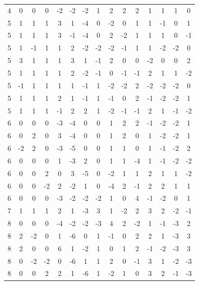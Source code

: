 \begin{table}[ht]
{\begin{tabular}{c@{\hspace{1em}}ccc@{\hspace{1em}}ccc@{\hspace{1em}}c@{\hspace{1em}}ccc@{\hspace{1em}}ccc@{\hspace{1em}}c}
 4 & 0 & 0 & 0 & -2 & -2 & -2 & 1 & 2 & 2 & 2 & 1 & 1 & 1 & 0 \\
 5 & 1 & 1 & 1 & 3 & 1 & -4 & 0 & -2 & 0 & 1 & 1 & -1 & 0 & 1 \\
 5 & 1 & 1 & 1 & 3 & -1 & -4 & 0 & 2 & -2 & 1 & 1 & 1 & 0 & -1 \\
 5 & 1 & -1 & 1 & 1 & 2 & -2 & -2 & -2 & -1 & 1 & 1 & -2 & -2 & 0 \\
 5 & 3 & 1 & 1 & 1 & 3 & 1 & -1 & 2 & 0 & 0 & -2 & 0 & 0 & 2 \\
 5 & 1 & 1 & 1 & 1 & 2 & -2 & -1 & 0 & -1 & -1 & 2 & 1 & 1 & -2 \\
 5 & -1 & 1 & 1 & 1 & 1 & -1 & 1 & -2 & -2 & 2 & -2 & -2 & -2 & 0 \\
 5 & 1 & 1 & 1 & 2 & 1 & -1 & 1 & -1 & 0 & 2 & -1 & -2 & -2 & 1 \\
 5 & 1 & 1 & 1 & -1 & 2 & 2 & 1 & -2 & -1 & -1 & 2 & 1 & -1 & -2 \\
 6 & 0 & 0 & 0 & -3 & -4 & 0 & 0 & 1 & 2 & 2 & -1 & -2 & -2 & 1 \\
 6 & 0 & 2 & 0 & 3 & -4 & 0 & 0 & 1 & 2 & 0 & 1 & -2 & -2 & 1 \\
 6 & -2 & 2 & 0 & -3 & -5 & 0 & 0 & 1 & 1 & 0 & 1 & -1 & -2 & 2 \\
 6 & 0 & 0 & 0 & 1 & -3 & 2 & 0 & 1 & 1 & -4 & 1 & -1 & -2 & -2 \\
 6 & 0 & 0 & 2 & 0 & 3 & -5 & 0 & -2 & 1 & 1 & 2 & 1 & 1 & -2 \\
 6 & 0 & 0 & -2 & 2 & -2 & 1 & 0 & -4 & 2 & -1 & 2 & 2 & 1 & 1 \\
 6 & 0 & 0 & 0 & -3 & -2 & -2 & -2 & 1 & 0 & 4 & -1 & -2 & 0 & 1 \\
 7 & 1 & 1 & 1 & 2 & 1 & -3 & 3 & 1 & -2 & 2 & 3 & 2 & -2 & -1 \\
 8 & 0 & 0 & 0 & -4 & -2 & -2 & -3 & 4 & 2 & -2 & 1 & -1 & -3 & 2 \\
 8 & 2 & -2 & 0 & 1 & -6 & 0 & 1 & -1 & 0 & 2 & 2 & 1 & -3 & 3 \\
 8 & 2 & 0 & 0 & 6 & 1 & -2 & 1 & 0 & 1 & 2 & -1 & -2 & -3 & 3 \\
 8 & 0 & -2 & -2 & 0 & -6 & 1 & 1 & 2 & 0 & -1 & 3 & 1 & -2 & -3 \\
 8 & 0 & 0 & 2 & 2 & 1 & -6 & 1 & -2 & 1 & 0 & 3 & 2 & -1 & -3 
\end{tabular}}
\end{table}

\clearpage


\setlength{\bibsep}{3pt plus 3pt minus 2pt}

\nocite{apsrev41Control}



